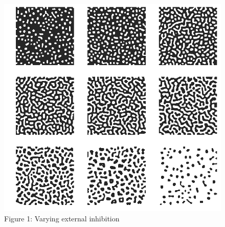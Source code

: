 \documentclass[12pt]{article}
\begin{document}
\begin{figure}
  \includegraphics[width=\linewidth]{inhibition.png}
  \caption{Figure 1: Varying external inhibition}
  \label{fig:s}
\end{figure}
\end{document}
